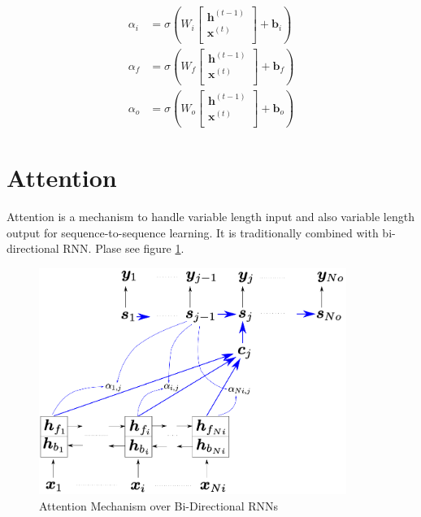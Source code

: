 \documentclass[a4]{article}
\begin{document}
\begin{equation}
\begin{aligned}
\alpha_i &= \sigma\left(W_i
\begin{bmatrix}
\bm{h}^{(t-1)}\\
\bm{x}^{(t)}\\
\end{bmatrix}
 + \bm{b}_i
\right)\\
\alpha_f &= \sigma\left(W_f
\begin{bmatrix}
\bm{h}^{(t-1)}\\
\bm{x}^{(t)}\\
\end{bmatrix}
 + \bm{b}_f
\right)\\
\alpha_o &= \sigma\left(W_o
\begin{bmatrix}
\bm{h}^{(t-1)}\\
\bm{x}^{(t)}\\
\end{bmatrix}
 + \bm{b}_o
\right)
\end{aligned}
\end{equation}



\section{Attention}
Attention is a mechanism to handle variable length input and also variable length output for 
sequence-to-sequence learning.
It is traditionally combined with bi-directional RNN.
Plase see figure \ref{fig:attention}.

\begin{figure}[!htb]
\centering
\includegraphics[width=10cm]{attention.png}
\caption{Attention Mechanism over Bi-Directional RNNs}
\label{fig:attention}
\end{figure}
\end{document}
